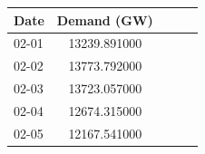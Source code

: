 \begin{tabular}{lcccr}
\toprule
Date & Demand (GW) \\
\midrule
02-01 & 13239.891000 \\
02-02 & 13773.792000 \\
02-03 & 13723.057000 \\
02-04 & 12674.315000 \\
02-05 & 12167.541000 \\
\bottomrule
\end{tabular}
